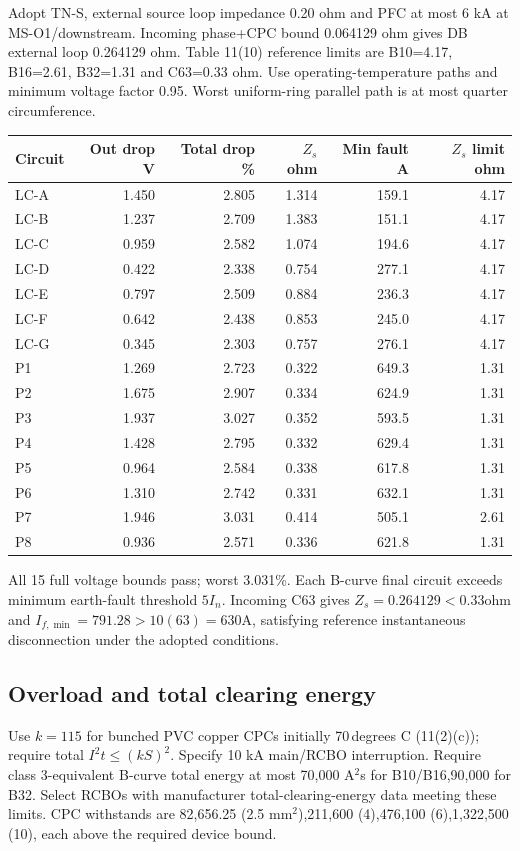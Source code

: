 Adopt TN-S, external source loop impedance 0.20 ohm and PFC at most 6 kA at MS-O1/downstream.  Incoming phase+CPC bound 0.064129 ohm gives DB external loop 0.264129 ohm. Table 11(10) reference limits are B10=4.17, B16=2.61, B32=1.31 and C63=0.33 ohm. Use operating-temperature paths and minimum voltage factor 0.95. Worst uniform-ring parallel path is at most quarter circumference.
\begin{longtable}{lrrrrr}\toprule
Circuit & Out drop V & Total drop \% & $Z_s$ ohm & Min fault A & $Z_s$ limit ohm\\\midrule\endhead

LC-A & 1.450 & 2.805 & 1.314 & 159.1 & 4.17 \\
LC-B & 1.237 & 2.709 & 1.383 & 151.1 & 4.17 \\
LC-C & 0.959 & 2.582 & 1.074 & 194.6 & 4.17 \\
LC-D & 0.422 & 2.338 & 0.754 & 277.1 & 4.17 \\
LC-E & 0.797 & 2.509 & 0.884 & 236.3 & 4.17 \\
LC-F & 0.642 & 2.438 & 0.853 & 245.0 & 4.17 \\
LC-G & 0.345 & 2.303 & 0.757 & 276.1 & 4.17 \\
P1 & 1.269 & 2.723 & 0.322 & 649.3 & 1.31 \\
P2 & 1.675 & 2.907 & 0.334 & 624.9 & 1.31 \\
P3 & 1.937 & 3.027 & 0.352 & 593.5 & 1.31 \\
P4 & 1.428 & 2.795 & 0.332 & 629.4 & 1.31 \\
P5 & 0.964 & 2.584 & 0.338 & 617.8 & 1.31 \\
P6 & 1.310 & 2.742 & 0.331 & 632.1 & 1.31 \\
P7 & 1.946 & 3.031 & 0.414 & 505.1 & 2.61 \\
P8 & 0.936 & 2.571 & 0.336 & 621.8 & 1.31 \\

\bottomrule\end{longtable}
All 15 full voltage bounds pass;  worst 3.031\%. Each B-curve final circuit exceeds minimum earth-fault threshold $5I_n$. Incoming C63 gives $Z_s=0.264129<0.33$ohm and $I_{f,\min}=791.28>10(63)=630$A, satisfying reference instantaneous disconnection under the adopted conditions.
\subsection*{Overload and total clearing energy}
Use $k=115$ for bunched PVC copper CPCs initially 70\,degrees C (11(2)(c));  require total $I^2t\le(kS)^2$. Specify 10 kA main/RCBO interruption. Require class 3-equivalent B-curve total energy at most 70,000 A$^2$s for B10/B16,90,000 for B32. Select RCBOs with manufacturer total-clearing-energy data meeting these limits. CPC withstands are 82,656.25 (2.5 mm$^2$),211,600 (4),476,100 (6),1,322,500 (10), each above the required device bound.


